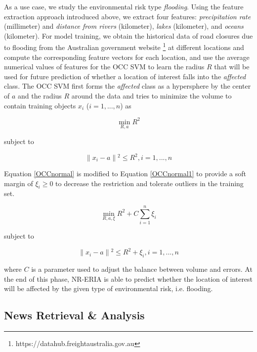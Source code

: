 \documentclass[]{ceurart}
\begin{document}
As a use case, we study the environmental risk type \textit{flooding}. Using the feature extraction approach introduced above, we extract four features: \emph{precipitation rate} (millimeter) and \emph{distance from rivers} (kilometer), \emph{lakes} (kilometer), and \emph{oceans} (kilometer). 
For model training, we obtain the historical data of road closures due to flooding from the Australian government website \footnote{https://datahub.freightaustralia.gov.au} at different locations and compute the corresponding feature vectors for each location, and use the average numerical values of features for the OCC SVM to learn the radius $R$ that will be used for future prediction of whether a location of interest falls into the \textit{affected} class. 
The OCC SVM first forms the \emph{affected} class as a hypersphere by the center of $a$ and the radius $R$ around the data and tries to minimize the volume to contain training objects $x_i$ ($i=1,...,n$) as 

\begin{equation}\label{OCCnormal}
    \min_{R, a}R^2
\end{equation}

subject to

\begin{equation}\label{OCCconstraints}
    \parallel{x_i - a}\parallel{^2}\leq R^2, i=1,...,n
\end{equation}

Equation \ref{OCCnormal} is modified to Equation \ref{OCCnormal1} to provide a soft margin of $\xi_i\geq0$ to decrease the restriction and tolerate outliers in the training set.

\begin{equation}\label{OCCnormal1}
    \min_{R, a, \xi}R^2 + C\sum_{i=1}^n\xi_i
\end{equation}

subject to

\begin{equation}\label{OCCconstraints1}
    \parallel{x_i - a}\parallel{^2}\leq R^2 + \xi_i, i=1,...,n
\end{equation}

where $C$ is a parameter used to adjust the balance between volume and errors. At the end of this phase, NR-ERIA is able to predict whether the location of interest will be affected by the given type of environmental risk, i.e. flooding.

\subsection {News Retrieval \& Analysis} \label{sec:news_retrieval}
\end{document}
